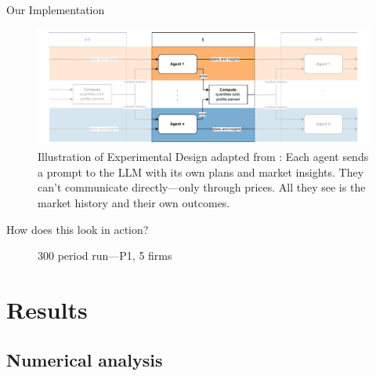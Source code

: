 \documentclass[10pt, aspectratio=169]{beamer}
\begin{document}
\begin{frame}[fragile]{Our Implementation}\label{experiment}
    \begin{figure}[htpb!]
      \centering
      \includegraphics[width=1\linewidth]{latex/imgs/illustration_diagram_experiment.pdf}
        \caption{Illustration of Experimental Design adapted from \textcite[p. 9]{fish_algorithmic_2025}: Each agent sends a prompt to the LLM with its own plans and market insights. They can't communicate directly—only through prices. All they see is the market history and their own outcomes.}
        \label{fig:experimental_design}
    \end{figure}
    \hfill\hyperlink{app:prompts}{}
\end{frame}


\begin{frame}{How does this look in action?}
    \begin{figure}
        \centering
        \caption{300 period run---P1, 5 firms}
        \label{fig:run}
    \end{figure}
\end{frame}


\section{Results}


\subsection{Numerical analysis}
\end{document}
